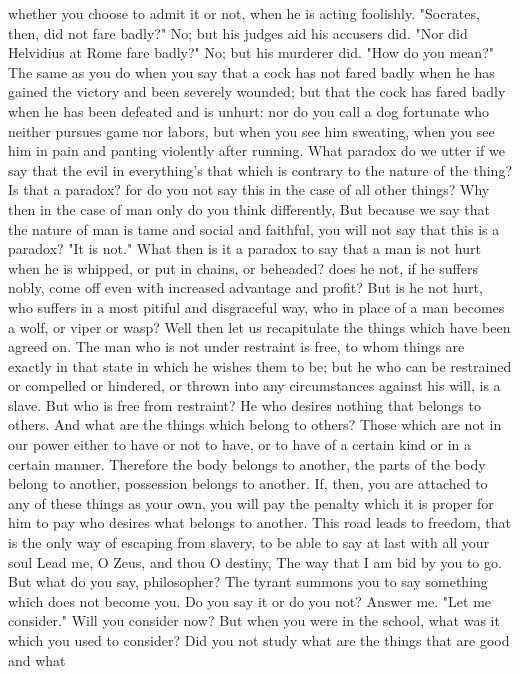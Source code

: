 \documentclass[a4paper]{article}
\begin{document}
whether you choose to admit it or not, when he is acting foolishly.
    "Socrates, then, did not fare badly?" No; but his judges aid his accusers
did. "Nor did Helvidius at Rome fare badly?" No; but his murderer did. "How do
you mean?" The same as you do when you say that a cock has not fared badly when
he has gained the victory and been severely wounded; but that the cock has
fared badly when he has been defeated and is unhurt: nor do you call a dog
fortunate who neither pursues game nor labors, but when you see him sweating,
when you see him in pain and panting violently after running. What paradox do
we utter if we say that the evil in everything's that which is contrary to the
nature of the thing? Is that a paradox? for do you not say this in the case of
all other things? Why then in the case of man only do you think differently,
But because we say that the nature of man is tame and social and faithful, you
will not say that this is a paradox? "It is not." What then is it a paradox to
say that a man is not hurt when he is whipped, or put in chains, or beheaded?
does he not, if he suffers nobly, come off even with increased advantage and
profit? But is he not hurt, who suffers in a most pitiful and disgraceful way,
who in place of a man becomes a wolf, or viper or wasp?
    Well then let us recapitulate the things which have been agreed on. The man
who is not under restraint is free, to whom things are exactly in that state in
which he wishes them to be; but he who can be restrained or compelled or
hindered, or thrown into any circumstances against his will, is a slave. But
who is free from restraint? He who desires nothing that belongs to others. And
what are the things which belong to others? Those which are not in our power
either to have or not to have, or to have of a certain kind or in a certain
manner. Therefore the body belongs to another, the parts of the body belong to
another, possession belongs to another. If, then, you are attached to any of
these things as your own, you will pay the penalty which it is proper for him
to pay who desires what belongs to another. This road leads to freedom, that is
the only way of escaping from slavery, to be able to say at last with all your
soul
       Lead me, O Zeus, and thou O destiny,
       The way that I am bid by you to go.
But what do you say, philosopher? The tyrant summons you to say something which
does not become you. Do you say it or do you not? Answer me. "Let me consider."
Will you consider now? But when you were in the school, what was it which you
used to consider? Did you not study what are the things that are good and what
\end{document}
